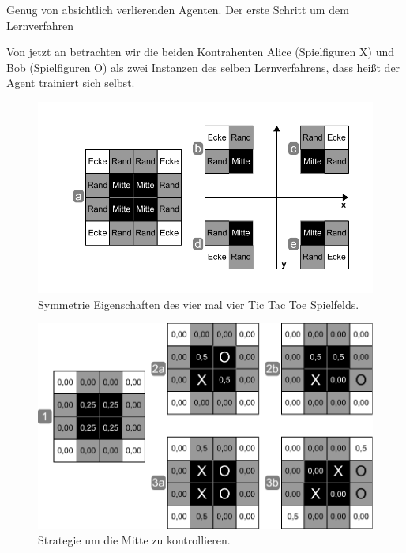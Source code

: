 Genug von absichtlich verlierenden Agenten. Der erste Schritt um dem Lernverfahren 

Von jetzt an betrachten wir die beiden Kontrahenten Alice (Spielfiguren X) und Bob (Spielfiguren O) als zwei Instanzen des selben Lernverfahrens, dass heißt der Agent trainiert sich selbst. \\


\begin{figure}[!htbp]
  \centering
  \includegraphics[scale = 1]{inhalt/abbildungen/symmetrie_tictactoe_spielfeld.pdf}
  \caption{Symmetrie Eigenschaften des vier mal vier Tic Tac Toe Spielfelds.}
  \label{fig:symmetrie_tictactoe_spielfeld}
\end{figure}


\begin{figure}[!htbp]
  \centering
  \includegraphics[scale = 0.8]{inhalt/abbildungen/kontrolliere_die_mitte.pdf}
  \caption{Strategie um die Mitte zu kontrollieren.}
  \label{fig:kontrolliere_die_mitte}
\end{figure}

